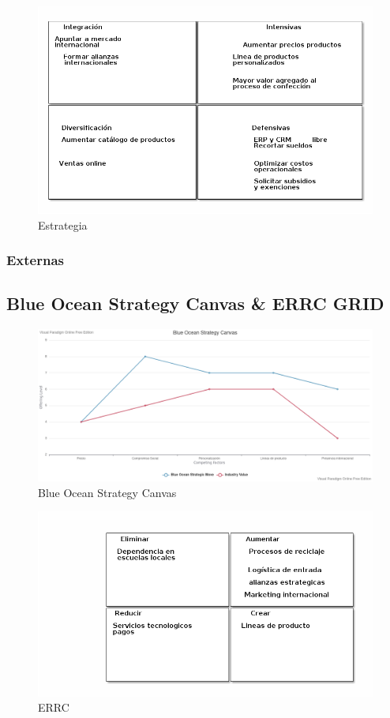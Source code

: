 \documentclass[11pt]{article}
\begin{document}
\begin{figure}[htbp]
\centering
\includegraphics[width=.9\linewidth]{./assets/build/means.png}
\caption{\label{fig:org029773d}Estrategia}
\end{figure}

\subsubsection{Externas}
\label{sec:org020969c}

\subsection{Blue Ocean Strategy Canvas \& ERRC GRID}
\label{sec:orgeb48be3}
\begin{figure}[htbp]
\centering
\includegraphics[width=.9\linewidth]{./assets/build/blue_ocean_canvas.png}
\caption{\label{fig:org95657a5}Blue Ocean Strategy Canvas}
\end{figure}
\begin{figure}[htbp]
\centering
\includegraphics[width=.9\linewidth]{./assets/build/ercc.png}
\caption{\label{fig:orga751ab0}ERRC}
\end{figure}
\end{document}
